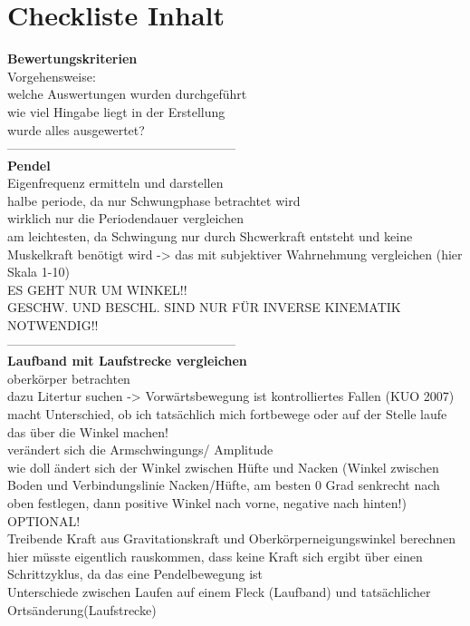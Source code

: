 \section{Checkliste Inhalt}
\textbf{Bewertungskriterien}\\
Vorgehensweise:\\
welche Auswertungen wurden durchgeführt\\
wie viel Hingabe liegt in der Erstellung\\
wurde alles ausgewertet?\\
------------------------------------------------------\\
\textbf{Pendel}\\
Eigenfrequenz ermitteln und darstellen\\
halbe periode, da nur Schwungphase betrachtet wird\\
wirklich nur die Periodendauer vergleichen\\
am leichtesten, da Schwingung nur durch Shcwerkraft entsteht und keine Muskelkraft benötigt wird -> das mit subjektiver Wahrnehmung vergleichen (hier Skala 1-10)\\
ES GEHT NUR UM WINKEL!!\\
GESCHW. UND BESCHL. SIND NUR FÜR INVERSE KINEMATIK NOTWENDIG!!\\
------------------------------------------------------\\
\textbf{Laufband mit Laufstrecke vergleichen}\\
oberkörper betrachten\\
dazu Litertur suchen -> Vorwärtsbewegung ist kontrolliertes Fallen (KUO 2007)
macht Unterschied, ob ich tatsächlich mich fortbewege oder auf der Stelle laufe\\
das über die Winkel machen!\\
verändert sich die Armschwingungs/ Amplitude\\
wie doll ändert sich der Winkel zwischen Hüfte und Nacken (Winkel zwischen Boden und Verbindungslinie Nacken/Hüfte, am besten 0 Grad senkrecht nach oben festlegen, dann positive Winkel nach vorne, negative nach hinten!)\\
OPTIONAL!\\
Treibende Kraft aus Gravitationskraft und Oberkörperneigungswinkel berechnen\\
hier müsste eigentlich rauskommen, dass keine Kraft sich ergibt über einen Schrittzyklus, da das eine Pendelbewegung ist\\
Unterschiede zwischen Laufen auf einem Fleck (Laufband) und tatsächlicher Ortsänderung(Laufstrecke)\\

